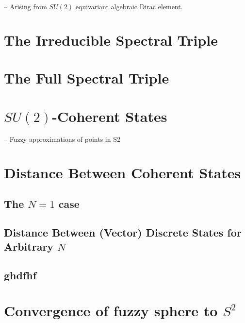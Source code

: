 -- Arising from $SU(2)$ equivariant algebraic Dirac element.

\section{The Irreducible Spectral Triple}

\section{The Full Spectral Triple}

\section{$SU(2)$-Coherent States}

-- Fuzzy approximations of points in S2

\section{Distance Between Coherent States}

\subsection{The $N=1$ case}

\subsection{Distance Between (Vector) Discrete States for Arbitrary $N$}

\subsection{ghdfhf}

\section{Convergence of fuzzy sphere to $S^2$}